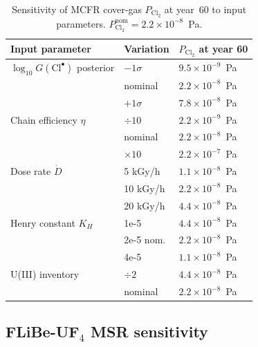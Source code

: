 \documentclass[11pt]{article}
\theoremstyle{plain}
\theoremstyle{definition}
\theoremstyle{remark}
\begin{document}
\begin{table}[h!]
\centering
\caption{Sensitivity of MCFR cover-gas $P_{\mathrm{Cl_2}}$ at year~60 to
input parameters.  $P_{\mathrm{Cl_2}}^{\mathrm{nom}} = 2.2 \times 10^{-8}$~Pa.}
\label{tab:mcfr-sens}
\small
\begin{tabular}{lll}
\toprule
Input parameter & Variation & $P_{\mathrm{Cl_2}}$ at year 60 \\
\midrule
$\log_{10}\!G(\mathrm{Cl}^{\bullet})$ posterior & $-1\sigma$ &  $9.5 \times 10^{-9}$~Pa \\
                                                & nominal    & $2.2 \times 10^{-8}$~Pa  \\
                                                & $+1\sigma$ &  $7.8 \times 10^{-8}$~Pa \\
Chain efficiency $\eta$                & $\div 10$  & $2.2 \times 10^{-9}$~Pa  \\
                                       & nominal    & $2.2 \times 10^{-8}$~Pa  \\
                                       & $\times 10$ & $2.2 \times 10^{-7}$~Pa  \\
Dose rate $\dot{D}$                    & 5 kGy/h    & $1.1 \times 10^{-8}$~Pa  \\
                                       & 10 kGy/h   & $2.2 \times 10^{-8}$~Pa  \\
                                       & 20 kGy/h   & $4.4 \times 10^{-8}$~Pa  \\
Henry constant $K_H$                   & 1e-5       & $4.4 \times 10^{-8}$~Pa  \\
                                       & 2e-5 nom.  & $2.2 \times 10^{-8}$~Pa  \\
                                       & 4e-5       & $1.1 \times 10^{-8}$~Pa  \\
U(III) inventory                       & $\div 2$   & $4.4 \times 10^{-8}$~Pa  \\
                                       & nominal    & $2.2 \times 10^{-8}$~Pa  \\
\bottomrule
\end{tabular}
\end{table}

\subsection{FLiBe-UF$_4$ MSR sensitivity}
\end{document}
